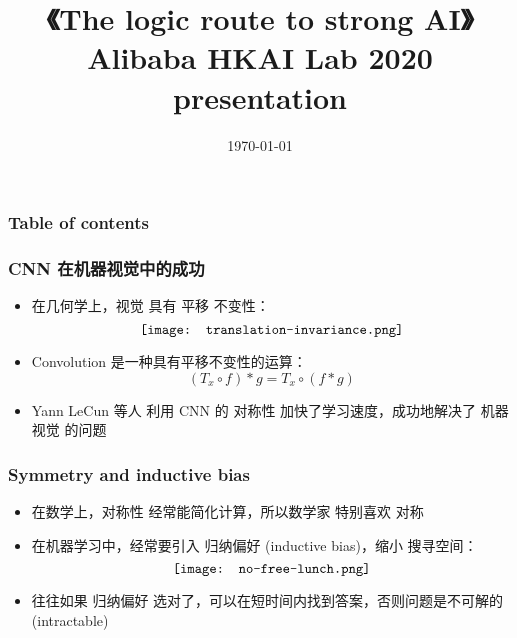 \documentclass[16pt]{beamer}
\title[Logic route to strong AI]{{\Huge《The logic route to strong AI》} \\ \vspace*{0.4cm} Alibaba HKAI Lab 2020 presentation}
\author{\cc{Heelal team}{Heelal team}} %
\date{\today} %
\makeatletter
\newcommand{\emp}[1]{{\color{violet}#1}}
\newcommand{\smiley}{$\vcenter{\hbox{\texttt{[image: ../smiling-face.png]}}}$}
\newif\ifframeinlbf
\newcommand\listofframes{\@starttoc{lbf}}
\makeatother
\begin{document}
\frameinlbffalse
\addtocounter{page}{-1}
\begin{frame}
\titlepage
\end{frame}

\addtocounter{page}{-1}
\begin{frame}[noframenumbering]
\frametitle{Table of contents}
\listofframes
\end{frame}



\frameinlbftrue

\begin{frame}
\frametitle{CNN 在机器视觉中的成功}
\begin{itemize}
	\item 在几何学上，视觉 具有 \emp{平移 不变性}：
	\begin{equation}
	\vcenter{\hbox{\texttt{[image: translation-invariance.png]}}}
	\end{equation}
	\item Convolution 是一种具有平移不变性的运算：
	\begin{equation}
	(T_x \circ f) * g = T_x \circ ( f * g )
	\end{equation}
	\item Yann LeCun 等人 利用 CNN 的 \emp{对称性} 加快了学习速度，成功地解决了 机器视觉 的问题
\end{itemize}
\end{frame}

\begin{frame}
\frametitle{Symmetry and inductive bias}
\begin{itemize}
	\item 在数学上，\emp{对称性} 经常能简化计算，所以数学家 特别喜欢 对称
	\item 在机器学习中，经常要引入 归纳偏好 (inductive bias)，缩小 \emp{搜寻空间}：
	\begin{equation}
	\vcenter{\hbox{\texttt{[image: no-free-lunch.png]}}}
	\end{equation}
	\item 往往如果 归纳偏好 选对了，可以在短时间内找到答案，否则问题是不可解的 (intractable)
\end{itemize}
\end{frame}
\end{document}
